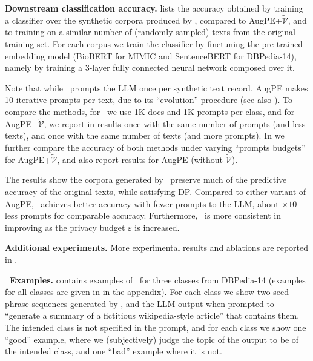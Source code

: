 \noindent\textbf{Downstream classification accuracy.}
 lists the accuracy obtained  by training a classifier over the synthetic corpora produced by \alg,
compared to AugPE+$\widetilde{\mathcal{V}}$, and to training on a similar number of (randomly sampled) texts from the original training set. 
For each corpus we train the classifier by finetuning the pre-trained embedding model (BioBERT for MIMIC and SentenceBERT for DBPedia-14), namely by training a 3-layer fully connected neural network composed over it. 

Note that while \alg\ prompts the LLM once per synthetic text record, AugPE makes 10 iterative prompts per text, due to its ``evolution'' procedure (see also ). To compare the methods, for \alg\ we use 1K docs and 1K prompts per class, and for AugPE+$\widetilde{\mathcal{V}}$, we report in  results once with the same number of prompts (and less texts), and once with the same number of texts (and more prompts). In  we further compare the accuracy of both methods under varying ``prompts budgets'' for AugPE+$\widetilde{\mathcal{V}}$, and also report results for AugPE (without $\widetilde{\mathcal{V}}$).

The results show the corpora generated by \alg\ preserve much of the predictive accuracy of the original texts, while satisfying DP. Compared to either variant of AugPE, \alg\ achieves better accuracy with fewer prompts to the LLM, about $\times10$ less prompts for comparable accuracy. 
Furthermore, \alg\ is more consistent in improving as the privacy budget $\varepsilon$ is increased.



\noindent\textbf{Additional experiments.} More experimental results and ablations are reported in .

\noindent\textbf{\alg\ Examples.}
 contains examples of \alg\ for three classes from DBPedia-14 (examples for all classes are given in   in the appendix). For each class we show two seed phrase sequences generated by \alg, and the LLM output when prompted to ``generate a summary of a fictitious wikipedia-style article'' that contains them. The intended class is not specified in the prompt, and for each class we show one ``good'' example, where we (subjectively) judge the topic of the output to be of the intended class, and one ``bad'' example where it is not. %


